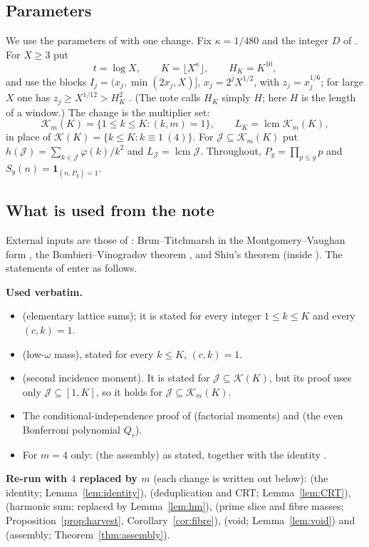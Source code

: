 \documentclass[10pt,reqno]{amsart}
\theoremstyle{definition}
\newcommand{\K}{\mathcal K}
\newcommand{\J}{\mathcal J}
\newcommand{\ind}{\mathbf 1}
\newcommand{\lcm}{\operatorname{lcm}}
\begin{document}
\subsection{Parameters}
We use the parameters of \cite[(2)]{TQ} with one change.  Fix
$\kappa=1/480$ and the integer $D$ of \cite[Lemma~3.3]{TQ}.  For $X\geq3$
put
\[
 t=\log X,\qquad K=\lfloor X^\kappa\rfloor,\qquad H_K=K^{10},
\]
and use the blocks $I_j=(x_j,\min(2x_j,X)]$, $x_j=2^jX^{1/2}$, with
$z_j=x_j^{1/6}$; for large $X$ one has $z_j\geq X^{1/12}>H_K^2$
\cite[(3)]{TQ}.  (The note calls $H_K$ simply $H$; here $H$ is the length of
a window.)  The change is the multiplier set:
\[
 \K_m(K)=\{1\leq k\leq K:(k,m)=1\},\qquad L_K=\lcm\K_m(K),
\]
in place of $\K(K)=\{k\leq K:k\equiv1\ (4)\}$.  For
$\J\subseteq\K_m(K)$ put $h(\J)=\sum_{k\in\J}\varphi(k)/k^2$ and
$L_{\J}=\lcm\J$.  Throughout, $P_y=\prod_{p\leq y}p$ and
$S_y(n)=\ind_{(n,P_y)=1}$.

\subsection{What is used from the note}
External inputs are those of \cite[\S3]{TQ}: Brun--Titchmarsh in the
Montgomery--Vaughan form \cite{MV}, the Bombieri--Vinogradov theorem
\cite[Ch.~28]{Davenport}, and Shiu's theorem \cite{Shiu} (inside
\cite[Lemma~3.3]{TQ}).  The statements of \cite{TQ} enter as follows.

\smallskip
\noindent\textbf{Used verbatim.}
\begin{itemize}
\item \cite[Lemma~3.1]{TQ} (elementary lattice sums); it is stated for
every integer $1\leq k\leq K$ and every $(c,k)=1$.
\item \cite[Lemma~3.3]{TQ} (low-$\omega$ mass), stated for every
$k\leq K$, $(c,k)=1$.
\item \cite[Lemma~4.1]{TQ} (second incidence moment).  It is stated for
$\J\subseteq\K(K)$, but its proof uses only $\J\subseteq[1,K]$, so it
holds for $\J\subseteq\K_m(K)$.
\item The conditional-independence proof of \cite[Theorem~6.3]{TQ}
(factorial moments) and \cite[Lemma~8.1]{TQ} (the even Bonferroni
polynomial $Q_r$).
\item For $m=4$ only: \cite[Theorem~8.2]{TQ} (the assembly) as stated,
together with the identity \cite[Lemma~2.1]{TQ}.
\end{itemize}

\noindent\textbf{Re-run with $4$ replaced by $m$} (each change is written
out below): \cite[Lemma~2.1]{TQ} (the identity; Lemma~\ref{lem:identity}),
\cite[Lemma~2.2]{TQ} (deduplication and CRT; Lemma~\ref{lem:CRT}),
\cite[Lemma~3.2]{TQ} (harmonic sum; replaced by Lemma~\ref{lem:hm}),
\cite[Theorem~4.2, Corollary~4.3]{TQ} (prime slice and fibre masses;
Proposition~\ref{prop:harvest}, Corollary~\ref{cor:fibre}),
\cite[Lemma~7.1]{TQ} (void; Lemma~\ref{lem:void}) and
\cite[Theorem~8.2]{TQ} (assembly; Theorem~\ref{thm:assembly}).
\end{document}
